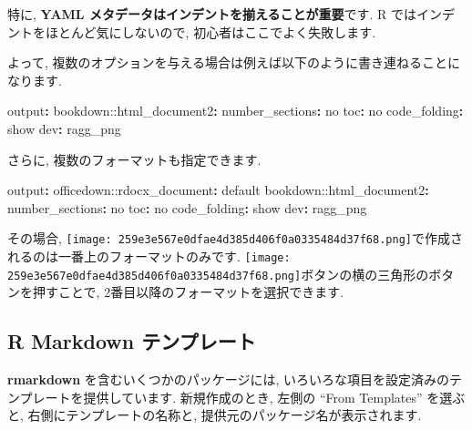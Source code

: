 \documentclass[
]{ltjsarticle}
\newenvironment{Shaded}{\begin{snugshade}}{\end{snugshade}}
\newcommand{\AttributeTok}[1]{\textcolor[rgb]{0.77,0.63,0.00}{#1}}
\newcommand{\CharTok}[1]{\textcolor[rgb]{0.31,0.60,0.02}{#1}}
\newcommand{\FunctionTok}[1]{\textcolor[rgb]{0.00,0.00,0.00}{#1}}
\newcommand{\KeywordTok}[1]{\textcolor[rgb]{0.13,0.29,0.53}{\textbf{#1}}}
\begin{document}
特に, \textbf{YAML メタデータはインデントを揃えることが重要}です. R ではインデントをほとんど気にしないので, 初心者はここでよく失敗します.

よって, 複数のオプションを与える場合は例えば以下のように書き連ねることになります.

\begin{Shaded}
\begin{Highlighting}[]
\FunctionTok{output}\KeywordTok{:}
\AttributeTok{  bookdown:}\FunctionTok{:html\_document2}\KeywordTok{:}
\AttributeTok{    }\FunctionTok{number\_sections}\KeywordTok{:}\AttributeTok{ }\CharTok{no}
\AttributeTok{    }\FunctionTok{toc}\KeywordTok{:}\AttributeTok{ }\CharTok{no}
\AttributeTok{    }\FunctionTok{code\_folding}\KeywordTok{:}\AttributeTok{ show}
\AttributeTok{    }\FunctionTok{dev}\KeywordTok{:}\AttributeTok{ ragg\_png}
\end{Highlighting}
\end{Shaded}

さらに, 複数のフォーマットも指定できます.

\begin{Shaded}
\begin{Highlighting}[]
\FunctionTok{output}\KeywordTok{:}
\AttributeTok{  officedown:}\FunctionTok{:rdocx\_document}\KeywordTok{:}\AttributeTok{ default}
\AttributeTok{  bookdown:}\FunctionTok{:html\_document2}\KeywordTok{:}
\AttributeTok{    }\FunctionTok{number\_sections}\KeywordTok{:}\AttributeTok{ }\CharTok{no}
\AttributeTok{    }\FunctionTok{toc}\KeywordTok{:}\AttributeTok{ }\CharTok{no}
\AttributeTok{    }\FunctionTok{code\_folding}\KeywordTok{:}\AttributeTok{ show}
\AttributeTok{    }\FunctionTok{dev}\KeywordTok{:}\AttributeTok{ ragg\_png}
\end{Highlighting}
\end{Shaded}

その場合, \texttt{[image: 259e3e567e0dfae4d385d406f0a0335484d37f68.png]}で作成されるのは一番上のフォーマットのみです. \texttt{[image: 259e3e567e0dfae4d385d406f0a0335484d37f68.png]}ボタンの横の三角形のボタンを押すことで, 2番目以降のフォーマットを選択できます.

\hypertarget{r-markdown-ux30c6ux30f3ux30d7ux30ecux30fcux30c8}{%
\subsection{R Markdown テンプレート}\label{r-markdown-ux30c6ux30f3ux30d7ux30ecux30fcux30c8}}

\textbf{rmarkdown} を含むいくつかのパッケージには, いろいろな項目を設定済みのテンプレートを提供しています. 新規作成のとき, 左側の ``From Templates'' を選ぶと, 右側にテンプレートの名称と, 提供元のパッケージ名が表示されます.
\end{document}
